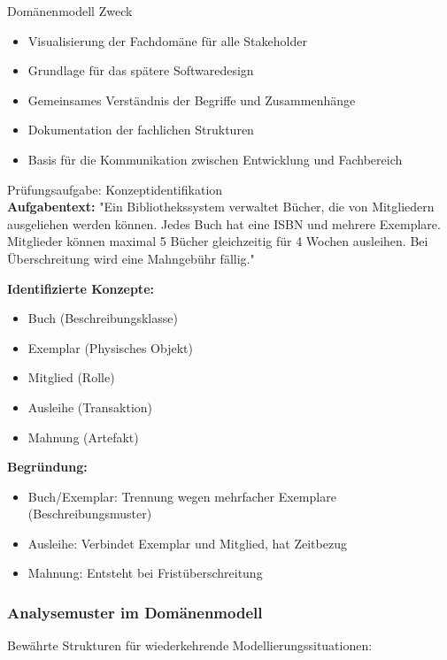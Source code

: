 \begin{theorem}{Domänenmodell Zweck}
\begin{itemize}
    \item Visualisierung der Fachdomäne für alle Stakeholder
    \item Grundlage für das spätere Softwaredesign
    \item Gemeinsames Verständnis der Begriffe und Zusammenhänge
    \item Dokumentation der fachlichen Strukturen
    \item Basis für die Kommunikation zwischen Entwicklung und Fachbereich
\end{itemize}
\end{theorem}

\begin{example2}{Prüfungsaufgabe: Konzeptidentifikation}\\
\textbf{Aufgabentext:} 
"Ein Bibliothekssystem verwaltet Bücher, die von Mitgliedern ausgeliehen werden können. Jedes Buch hat eine ISBN und mehrere Exemplare. Mitglieder können maximal 5 Bücher gleichzeitig für 4 Wochen ausleihen. Bei Überschreitung wird eine Mahngebühr fällig."

\textbf{Identifizierte Konzepte:}
\begin{itemize}
    \item Buch (Beschreibungsklasse)
    \item Exemplar (Physisches Objekt)
    \item Mitglied (Rolle)
    \item Ausleihe (Transaktion)
    \item Mahnung (Artefakt)
\end{itemize}

\textbf{Begründung:}
\begin{itemize}
    \item Buch/Exemplar: Trennung wegen mehrfacher Exemplare (Beschreibungsmuster)
    \item Ausleihe: Verbindet Exemplar und Mitglied, hat Zeitbezug
    \item Mahnung: Entsteht bei Fristüberschreitung
\end{itemize}
\end{example2}

\subsubsection{Analysemuster im Domänenmodell}
Bewährte Strukturen für wiederkehrende Modellierungssituationen:

